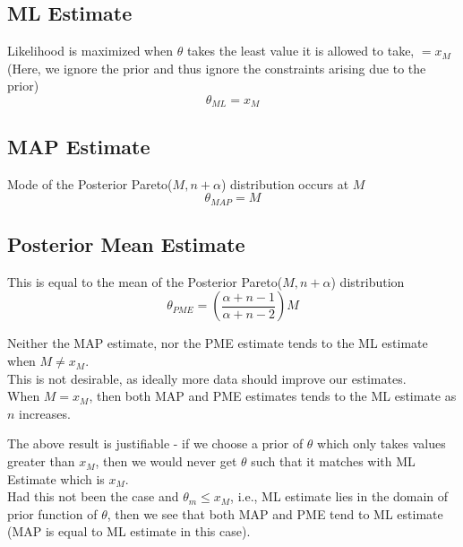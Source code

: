 \documentclass[11pt, fleqn]{article}
\begin{document}
\subsection*{ML Estimate}
Likelihood is maximized when $\theta$ takes the least value it is allowed to take, $= x_M$ (Here, we ignore the prior and thus ignore the constraints arising due to the prior)
$$
    \boxed{\theta_{ML} = x_M}
$$
\subsection*{MAP Estimate}
Mode of the Posterior Pareto($M, n+\alpha$) distribution occurs at $M$
$$
    \boxed{\theta_{MAP} = M}
$$
\subsection*{Posterior Mean Estimate}
This is equal to the mean of the Posterior Pareto($M, n+\alpha$) distribution
$$
    \boxed{\theta_{PME} = \left(\frac{\alpha + n - 1}{\alpha + n - 2}\right)M}
$$
  
\medskip
Neither the MAP estimate, nor the PME estimate tends to the ML estimate when $M \neq x_M$.\\
This is not desirable, as ideally more data should improve our estimates.\\
When $M = x_M$, then both MAP and PME estimates tends to the ML estimate as $n$ increases.

\medskip
The above result is justifiable - if we choose a prior of $\theta$ which only takes values greater than $x_M$, then we would never get $\theta$ such that it matches with ML Estimate which is $x_M$. \\
Had this not been the case and $\theta_m \le x_M$, i.e., ML estimate lies in the domain of prior function of $\theta$, then we see that both MAP and PME tend to ML estimate (MAP is equal to ML estimate in this case).
\end{document}
